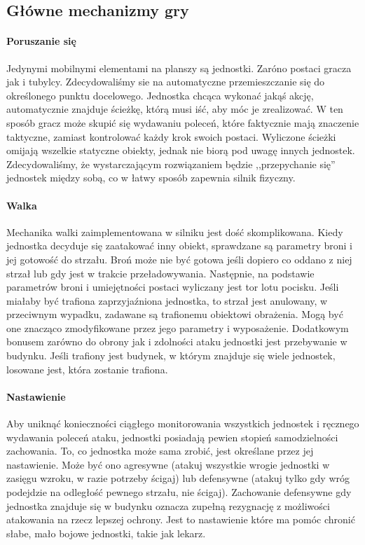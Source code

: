 \documentclass[licencjacka]{pracamgr}
\begin{document}
    \subsection{Główne mechanizmy gry}
    \paragraph{Poruszanie się}
      Jedynymi mobilnymi elementami na planszy są jednostki. Zaróno postaci gracza jak i tubylcy. Zdecydowaliśmy sie na automatyczne
      przemieszczanie się do określonego punktu docelowego. Jednostka chcąca wykonać jakąś akcję, automatycznie znajduje
      ścieżkę, którą musi iść, aby móc je zrealizować. W ten sposób gracz może skupić się wydawaniu poleceń, które faktycznie mają
      znaczenie taktyczne, zamiast kontrolować każdy krok swoich postaci. Wyliczone ścieżki omijają wszelkie statyczne obiekty, jednak
      nie biorą pod uwagę innych jednostek. Zdecydowaliśmy, że wystarczającym rozwiązaniem będzie ,,przepychanie się'' jednostek między sobą,
      co w łatwy sposób zapewnia silnik fizyczny.
    \paragraph{Walka}
      Mechanika walki zaimplementowana w silniku jest dość skomplikowana. Kiedy jednostka decyduje się zaatakować inny obiekt,
      sprawdzane są parametry broni i jej gotowość do strzału. Broń może nie być gotowa jeśli dopiero co oddano z niej strzał lub gdy
      jest w trakcie przeładowywania. Następnie, na podstawie parametrów broni i umiejętności postaci wyliczany jest tor lotu pocisku.
      Jeśli miałaby być trafiona zaprzyjaźniona jednostka, to strzał jest anulowany, w przeciwnym wypadku, zadawane są trafionemu obiektowi
      obrażenia. Mogą być one znacząco zmodyfikowane przez jego parametry i wyposażenie. Dodatkowym bonusem zarówno do obrony jak i zdolności
      ataku jednostki jest przebywanie w budynku. Jeśli trafiony jest budynek, w którym znajduje się wiele jednostek, losowane jest, która
      zostanie trafiona.
    \paragraph{Nastawienie}
      Aby uniknąć konieczności ciągłego monitorowania wszystkich jednostek i ręcznego wydawania poleceń ataku, jednostki posiadają pewien
      stopień samodzielności zachowania. To, co jednostka może sama zrobić, jest określane przez jej nastawienie. Może być ono agresywne
      (atakuj wszystkie wrogie jednostki w zasięgu wzroku, w razie potrzeby ścigaj) lub defensywne (atakuj tylko gdy wróg podejdzie na
      odległość pewnego strzału, nie ścigaj). Zachowanie defensywne gdy jednostka znajduje się w budynku oznacza zupełną rezygnację z
      możliwości atakowania na rzecz lepszej ochrony. Jest to nastawienie które ma pomóc chronić słabe, mało bojowe jednostki, takie jak lekarz.
\end{document}
